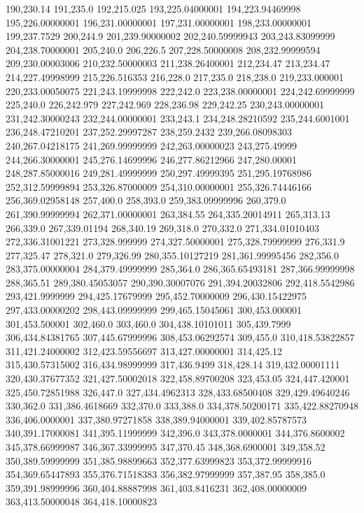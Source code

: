 190,230.14
191,235.0
192,215.025
193,225.04000001
194,223.94469998
195,226.00000001
196,231.00000001
197,231.00000001
198,233.00000001
199,237.7529
200,244.9
201,239.90000002
202,240.59999943
203,243.83099999
204,238.70000001
205,240.0
206,226.5
207,228.50000008
208,232.99999594
209,230.00003006
210,232.50000003
211,238.26400001
212,234.47
213,234.47
214,227.49998999
215,226.516353
216,228.0
217,235.0
218,238.0
219,233.000001
220,233.00050075
221,243.19999998
222,242.0
223,238.00000001
224,242.69999999
225,240.0
226,242.979
227,242.969
228,236.98
229,242.25
230,243.00000001
231,242.30000243
232,244.00000001
233,243.1
234,248.28210592
235,244.6001001
236,248.47210201
237,252.29997287
238,259.2432
239,266.08098303
240,267.04218175
241,269.99999999
242,263.00000023
243,275.49999
244,266.30000001
245,276.14699996
246,277.86212966
247,280.00001
248,287.85000016
249,281.49999999
250,297.49999395
251,295.19768986
252,312.59999894
253,326.87000009
254,310.00000001
255,326.74446166
256,369.02958148
257,400.0
258,393.0
259,383.09999996
260,379.0
261,390.99999994
262,371.00000001
263,384.55
264,335.20014911
265,313.13
266,339.0
267,339.01194
268,340.19
269,318.0
270,332.0
271,334.01010403
272,336.31001221
273,328.999999
274,327.50000001
275,328.79999999
276,331.9
277,325.47
278,321.0
279,326.99
280,355.10127219
281,361.99995456
282,356.0
283,375.00000004
284,379.49999999
285,364.0
286,365.65493181
287,366.99999998
288,365.51
289,380.45053057
290,390.30007076
291,394.20032806
292,418.5542986
293,421.9999999
294,425.17679999
295,452.70000009
296,430.15422975
297,433.00000202
298,443.09999999
299,465.15045061
300,453.000001
301,453.500001
302,460.0
303,460.0
304,438.10101011
305,439.7999
306,434.84381765
307,445.67999996
308,453.06292574
309,455.0
310,418.53822857
311,421.24000002
312,423.59556697
313,427.00000001
314,425.12
315,430.57315002
316,434.98999999
317,436.9499
318,428.14
319,432.00001111
320,430.37677352
321,427.50002018
322,458.89700208
323,453.05
324,447.420001
325,450.72851988
326,447.0
327,434.4962313
328,433.68500408
329,429.49640246
330,362.0
331,386.4618669
332,370.0
333,388.0
334,378.50200171
335,422.88270948
336,406.0000001
337,380.97271858
338,389.94000001
339,402.85787573
340,391.17000081
341,395.11999999
342,396.0
343,378.0000001
344,376.8600002
345,378.66999987
346,367.33999995
347,370.45
348,368.6900001
349,358.52
350,389.59999999
351,385.98899663
352,377.63999823
353,372.99999916
354,369.65447893
355,376.71518383
356,382.97999999
357,387.95
358,385.0
359,391.98999996
360,404.88887998
361,403.8416231
362,408.00000009
363,413.50000048
364,418.10000823
